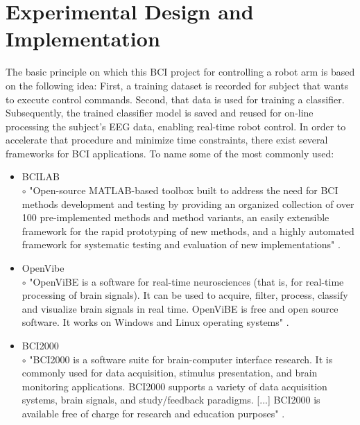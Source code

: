 \documentclass[a4paper,twoside, openright,12pt]{report}
\begin{document}
\chapter{Experimental Design and Implementation}
The basic principle on which this BCI project for controlling a robot arm is based on the following idea: First, a training dataset is recorded for subject that wants to execute control commands. Second, that data is used for training a classifier. Subsequently, the trained classifier model is saved and reused for on-line processing the subject's EEG data, enabling real-time robot control. In order to accelerate that procedure and minimize time constraints, there exist several frameworks for BCI applications. To name some of the most commonly used:
\begin{itemize}
	\item BCILAB\\
	$\circ$  "Open-source MATLAB-based toolbox built to address the need for BCI methods development and testing by providing an organized collection of over 100 pre-implemented methods and method variants, an easily extensible framework for the rapid prototyping of new methods, and a highly automated framework for systematic testing and evaluation of new implementations" \cite{kothe2013bcilab}.
	\item OpenVibe\\
	$\circ$ "OpenViBE is a software for real-time neurosciences (that is, for real-time processing of brain signals). It can be used to acquire, filter, process, classify and visualize brain signals in real time. OpenViBE is free and open source software. It works on Windows and Linux operating systems" \cite{journals/presence/RenardLGCMDBL10}.
	\item BCI2000\\
	$\circ$ "BCI2000 is a software suite for brain-computer interface research. It is commonly used for data acquisition, stimulus presentation, and brain monitoring applications. BCI2000 supports a variety of data acquisition systems, brain signals, and study/feedback paradigms. [...] BCI2000 is available free of charge for research and education purposes" \cite{schalk2010practical}.
\end{itemize}
\end{document}
